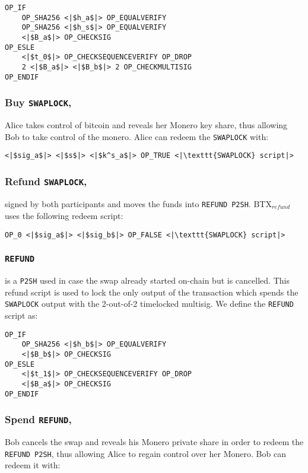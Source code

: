 \documentclass{llncs}
\begin{document}
\begin{verbatim}
OP_IF
    OP_SHA256 <|$h_a$|> OP_EQUALVERIFY
    OP_SHA256 <|$h_s$|> OP_EQUALVERIFY
    <|$B_a$|> OP_CHECKSIG
OP_ESLE
    <|$t_0$|> OP_CHECKSEQUENCEVERIFY OP_DROP
    2 <|$B_a$|> <|$B_b$|> 2 OP_CHECKMULTISIG
OP_ENDIF
\end{verbatim}

\subsubsection{Buy \texttt{SWAPLOCK},}
Alice takes control of bitcoin and reveals her Monero key share, thus allowing Bob to take control of the monero. Alice can redeem the \texttt{SWAPLOCK} with:

\begin{verbatim}
<|$sig_a$|> <|$s$|> <|$k^s_a$|> OP_TRUE <|\texttt{SWAPLOCK} script|>
\end{verbatim}

\subsubsection{Refund \texttt{SWAPLOCK},}
signed by both participants and moves the funds into \texttt{REFUND P2SH}. $\text{BTX}_\textit{refund}$ uses the following redeem script:

\begin{verbatim}
OP_0 <|$sig_a$|> <|$sig_b$|> OP_FALSE <|\texttt{SWAPLOCK} script|>
\end{verbatim}

\subsubsection{\texttt{REFUND}}
is a \texttt{P2SH} used in case the swap already started on-chain but is cancelled. This refund script is used to lock the only output of the transaction which spends the \texttt{SWAPLOCK} output with the 2-out-of-2 timelocked multisig. We define the \texttt{REFUND} script as:

\begin{verbatim}
OP_IF
    OP_SHA256 <|$h_b$|> OP_EQUALVERIFY
    <|$B_b$|> OP_CHECKSIG
OP_ESLE
    <|$t_1$|> OP_CHECKSEQUENCEVERIFY OP_DROP
    <|$B_a$|> OP_CHECKSIG
OP_ENDIF
\end{verbatim}

\subsubsection{Spend \texttt{REFUND},}
Bob cancels the swap and reveals his Monero private share in order to redeem the \texttt{REFUND P2SH}, thus allowing Alice to regain control over her Monero. Bob can redeem it with:
\end{document}
